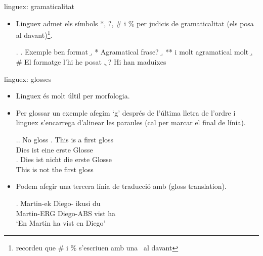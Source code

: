\begin{frame}[fragile]{linguex: gramaticalitat}
\begin{itemize}
    \item Linguex admet els símbols *, ?, \# i \% per judicis de gramaticalitat (els posa al davant)\footnote{recordeu que \# i \% s'escriuen amb una \bs~al davant}.
\begin{exampletwouptiny2}
\ex.
\a. Exemple ben format
\b. * Agramatical frase?
\b. ** i molt agramatical molt
\b. \# El formatge l'hi he posat
\c. ? Hi han maduixes

\end{exampletwouptiny2}
\end{itemize}

\end{frame}

\begin{frame}[fragile]{linguex: glosses}
\begin{itemize}
\item Linguex és molt últil per morfologia.
\item Per glossar un exemple afegim `g' després de l'última lletra de l'ordre i linguex s'encarrega d'alinear les paraules (cal \keystrokebftt{\bs\bs}  per marcar el final de línia).
\begin{exampletwouptiny2}
\ex.\a. No gloss
\bg. This is a first gloss\\
Dies ist eine erste Glosse\\

\exg.
Dies ist nicht die erste Glosse\\
This is not the first gloss\\

\end{exampletwouptiny2}
\item Podem afegir una tercera línia de traducció amb  (gloss translation).
\begin{exampletwouptiny2}
\exg.
Martin-ek Diego-\zero{} ikusi du \\
Martin-ERG Diego-ABS vist ha \\
\glt `En Martin ha vist en Diego'

\end{exampletwouptiny2}
\end{itemize}

\end{frame}

